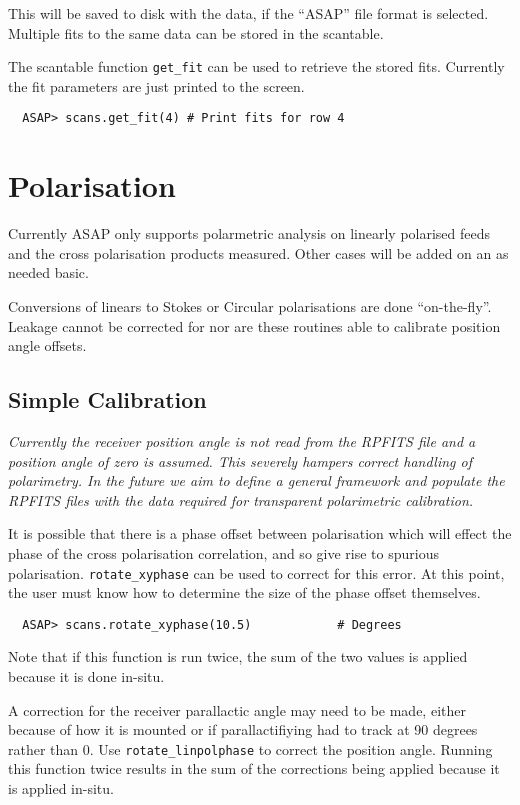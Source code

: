 \documentclass[11pt]{article}
\newcommand{\cmd}[1]{{\tt #1}}
\begin{document}
This will be saved to disk with the data, if the ``ASAP'' file format
is selected. Multiple fits to the same data can be stored in the
scantable.

The scantable function \cmd{get\_fit} can be used to retrieve the
stored fits. Currently the fit parameters are just printed to the
screen.

\begin{verbatim}
  ASAP> scans.get_fit(4) # Print fits for row 4
\end{verbatim}

\section{Polarisation}

Currently ASAP only supports polarmetric analysis
on linearly polarised feeds and the cross polarisation products
measured. Other cases will be added on an as needed basic.

Conversions of linears to Stokes or Circular polarisations are done
``on-the-fly''. Leakage cannot be corrected for nor are these routines
able to calibrate position angle offsets.

\subsection{Simple Calibration}

{\em Currently the receiver position angle is not read from the RPFITS
file and a position angle of zero is assumed. This severely hampers
correct handling of polarimetry. In the future we aim to define a
general framework and populate the RPFITS files with the data required
for transparent polarimetric calibration.}

It is possible that there is a phase
offset between polarisation which will effect the phase of the cross
polarisation correlation, and so give rise to spurious
polarisation. \cmd{rotate\_xyphase} can be used to correct for this
error. At this point, the user must know how to determine the size of
the phase offset themselves.

\begin{verbatim}
  ASAP> scans.rotate_xyphase(10.5)            # Degrees
\end{verbatim}

Note that if this function is run twice, the sum of the two values is
applied because it is done in-situ.

A correction for the receiver parallactic angle may need to be made,
either because of how it is mounted or if parallactifiying had to track
at 90 degrees rather than 0. Use \cmd{rotate\_linpolphase} to correct
the position angle. Running this function twice results in the sum of
the corrections being applied because it is applied in-situ.
\end{document}
